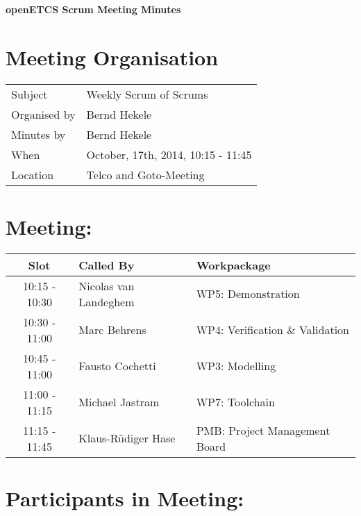 \documentclass[a4paper, 11pt]{article}
\begin{document}
{\begin{center}\huge\bf openETCS Scrum Meeting Minutes\end{center}}
\section{Meeting Organisation}

\renewcommand{\arraystretch}{1.5}
\begin{supertabular}{m{.2\textwidth}m{.8\textwidth}}
Subject & Weekly Scrum of Scrums\\
Organised by &Bernd Hekele\\
Minutes by & Bernd Hekele\\
When & October, 17th, 2014, 10:15 - 11:45\\
Location & Telco and Goto-Meeting\\
\end{supertabular}

\renewcommand{\arraystretch}{1.0}
\section{Meeting:}

\begin{tabular}{|c|l|l|}
\hline
\textbf{Slot} &  \textbf{Called By} & \textbf{Workpackage} \\
\hline  
10:15 - 10:30 & Nicolas van Landeghem & WP5: Demonstration \\\hline  
10:30 - 11:00 & Marc Behrens & WP4: Verification \& Validation \\\hline  
10:45 - 11:00 & Fausto Cochetti & WP3: Modelling \\\hline  
11:00 - 11:15 & Michael Jastram & WP7: Toolchain \\\hline
11:15 - 11:45 & Klaus-R\"udiger Hase & PMB: Project Management Board \\\hline  
\end{tabular}

\section{Participants in Meeting:}
\end{document}
